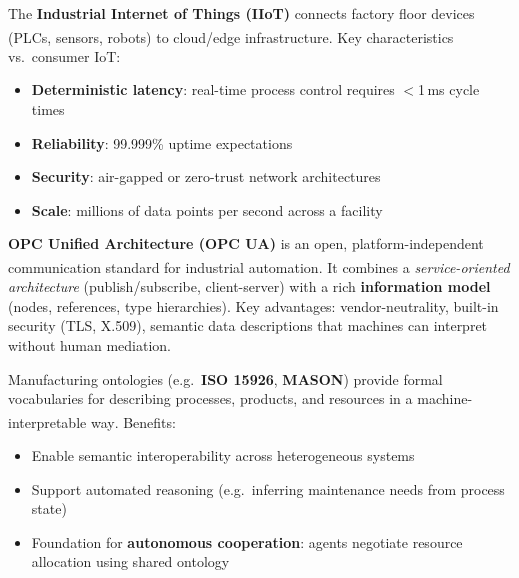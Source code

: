 \begin{tcbitemize}[ skin=sectionraster ]
    \tcbitem[title={IoT and IIoT}, raster multicolumn=3]
    The \textbf{Industrial Internet of Things (IIoT)} connects factory floor devices (PLCs, sensors, robots) to cloud/edge infrastructure\textsuperscript{\cite[][pp.~1--15]{mahmoodInternetThingsIndustrial2019}}.
    Key characteristics vs.\ consumer IoT:
    \begin{itemize}
        \item \textbf{Deterministic latency}: real-time process control requires $<$1\,ms cycle times
        \item \textbf{Reliability}: 99.999\% uptime expectations
        \item \textbf{Security}: air-gapped or zero-trust network architectures
        \item \textbf{Scale}: millions of data points per second across a facility
    \end{itemize}

    \tcbitem[title=OPC UA: The Industrial Lingua Franca, raster multicolumn=3]
    \textbf{OPC Unified Architecture (OPC UA)} is an open, platform-independent communication standard for industrial automation\textsuperscript{\cite[][pp.~45--60]{veneriHandsOnIndustrialInternet2018}}.
    It combines a \emph{service-oriented architecture} (publish/subscribe, client-server) with a rich \textbf{information model} (nodes, references, type hierarchies).
    Key advantages: vendor-neutrality, built-in security (TLS, X.509), semantic data descriptions that machines can interpret without human mediation.

    \tcbitem[title={Formal Ontologies for Manufacturing}, raster multicolumn=3]
    Manufacturing ontologies (e.g.\ \textbf{ISO 15926}, \textbf{MASON}) provide formal vocabularies for describing processes, products, and resources in a machine-interpretable way\textsuperscript{\cite[][pp.~8--12]{dafflonChallengesApproachesCPS2021}}.
    Benefits:
    \begin{itemize}
        \item Enable semantic interoperability across heterogeneous systems
        \item Support automated reasoning (e.g.\ inferring maintenance needs from process state)
        \item Foundation for \textbf{autonomous cooperation}: agents negotiate resource allocation using shared ontology
    \end{itemize}
\end{tcbitemize}

